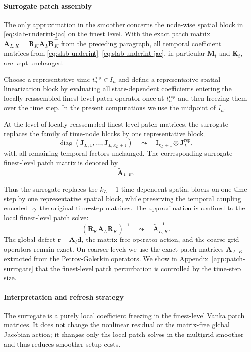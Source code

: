 \documentclass[DIV=16]{scrartcl}
\DeclareMathOperator{\diag}{diag}
\newcommand{\In}{I_n}
\begin{document}
\paragraph{Surrogate patch assembly}
The only approximation in the smoother concerns the node-wise spatial block in
\eqref{eq:slab-underint-jac} on the finest level.
With the exact patch matrix
$\bm A_{L,K}=\bm R_K \bm A_L \bm R_K^\top$ from the preceding paragraph,
all temporal coefficient matrices from
\eqref{eq:slab-underint}--\eqref{eq:slab-underint-jac}, in particular
$\bm M_t$ and $\bm K_t$, are kept unchanged.

Choose a representative time $t_n^{\mathrm{rep}}\in \In$ and define a
representative spatial linearization block by evaluating all state-dependent
coefficients entering the locally reassembled finest-level patch operator once
at $t_n^{\mathrm{rep}}$ and then freezing them over the time step.
In the present computations we use the midpoint of $\In$.

At the level of locally reassembled finest-level patch matrices, the surrogate
replaces the family of time-node blocks by one representative block,
\begin{equation}\label{eq:surrogate-diag}
  \diag(\bm J_{L,1},\dots,\bm J_{L,k_L+1})
  \quad\leadsto\quad
  \bm I_{k_L+1}\otimes \bm J_L^{\mathrm{rep}},
\end{equation}
with all remaining temporal factors unchanged.
The corresponding surrogate finest-level patch matrix is denoted by
\[
  \tilde{\bm A}_{L,K}.
\]

Thus the surrogate replaces the $k_L+1$ time-dependent spatial blocks on one
time step by one representative spatial block, while preserving the temporal
coupling encoded by the original time-step matrices.
The approximation is confined to the local finest-level patch solve:
\[
  (\bm R_K \bm A_L \bm R_K^\top)^{-1}
  \quad\leadsto\quad
  \tilde{\bm A}_{L,K}^{-1}.
\]
The global defect $\bm r-\bm A_\ell \bm d$, the matrix-free operator action,
and the coarse-grid operators remain exact. On coarser levels we use the exact
patch matrices $\bm A_{\ell,K}$ extracted from the Petrov-Galerkin operators.
We show in Appendix~\ref{app:patch-surrogate} that the finest-level patch
perturbation is controlled by the time-step size.

\paragraph{Interpretation and refresh strategy}
The surrogate is a purely local coefficient freezing in the finest-level Vanka
patch matrices. It does not change the nonlinear residual or the matrix-free
global Jacobian action; it changes only the local patch solves in the multigrid
smoother and thus reduces smoother setup costs.
\end{document}
